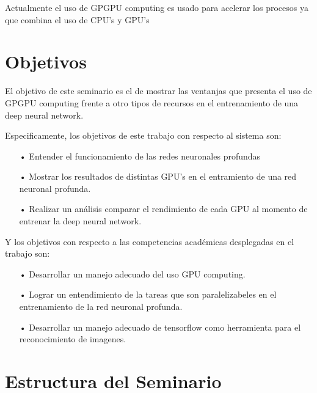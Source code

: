  Actualmente el uso de GPGPU computing es usado para acelerar los procesos ya que combina el uso de CPU's y GPU's 


\section{Objetivos}

El objetivo de este seminario es el de mostrar las ventanjas que presenta el uso de GPGPU computing frente a otro tipos de recursos en el entrenamiento de una deep neural network.

Especificamente, los objetivos de este trabajo con respecto al sistema son:

\begin{itemize}
\item[•] Entender el funcionamiento de las redes neuronales profundas%
\item[•] Mostrar los resultados de distintas GPU's en el entramiento de una red neuronal profunda.%
\item[•] Realizar un análisis comparar el rendimiento de cada GPU al momento de entrenar la deep neural network.%


\end{itemize}

Y los objetivos con respecto a las competencias académicas desplegadas en el trabajo son:
\begin{itemize}
\item[•] Desarrollar un manejo adecuado del uso GPU computing.%
\item[•] Lograr un entendimiento de la tareas que son paralelizabeles en el entrenamiento de la red neuronal profunda.%
\item[•] Desarrollar un manejo adecuado de tensorflow como herramienta para el reconocimiento de imagenes.%

\end{itemize}

\section{Estructura del Seminario}


